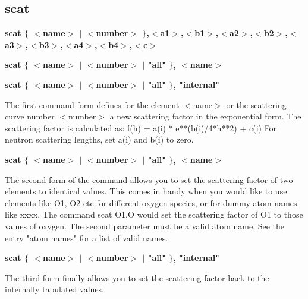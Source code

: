 \subsection*{scat}
{\bf scat $ \{$ $ <$name$> $ $| $ $ <$number$> $ $\} $,$ <$a1$> $,$ <$b1$> $,$ <$a2$> $,$ <$b2$> $,$ <$a3$> $,$ <$b3$> $,$ <$a4$> $,$ <$b4$> $,$ <$c$> $ \par }
{\bf scat $ \{$ $ <$name$> $ $| $ $ <$number$> $ $| $ "all" $\} $, $ <$name$> $ \par }
{\bf scat $ \{$ $ <$name$> $ $| $ $ <$number$> $ $| $ "all" $\} $, "internal" \par }
\par
\vspace{3pt}
The first command form defines for the element $ <$name$> $ or the scattering 
curve number $ <$number$> $ a new scattering factor in the exponential form. 
The scattering factor is calculated as: 
f(h) = a(i) * e**(b(i)/4*h**2) + c(i) 
For neutron scattering lengths, set a(i) and b(i) to zero. 
\par
{\bf scat $ \{$ $ <$name$> $ $| $ $ <$number$> $ $| $ "all" $\} $, $ <$name$> $ \par }
\par
\vspace{3pt}
The second form of the command allows you to set the scattering factor 
of two elements to identical values. This comes in handy when you would 
like to use elements like O1, O2 etc for different oxygen species, or 
for dummy atom names like xxxx. The command 
scat O1,O 
would set the scattering factor of O1 to those values of oxygen. The 
second parameter must be a valid atom name. See the entry "atom names" 
for a list of valid names. 
\par
{\bf scat $ \{$ $ <$name$> $ $| $ $ <$number$> $ $| $ "all" $\} $, "internal" \par }
\par
\vspace{3pt}
The third form finally allows you to set the scattering factor back 
to the internally tabulated values. 
